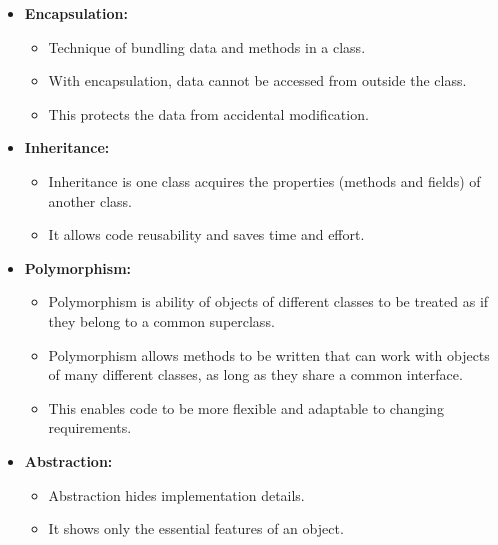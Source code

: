 

\begin{flushleft}
	
	\begin{itemize}
		\item \textbf{Encapsulation:}
		\begin{itemize}
			\item Technique of bundling data and methods in a class. 
			\item With encapsulation, data cannot be accessed from outside the class. 
			\item This protects the data from accidental modification.
			
		\end{itemize}
		
		\item \textbf{Inheritance:}
		\begin{itemize}
			\item Inheritance is one class acquires the properties (methods and fields) of another class.
			\item It allows code reusability and saves time and effort.
		\end{itemize}
	
		\newpage
		\item \textbf{Polymorphism: }
		\begin{itemize}
			\item Polymorphism is ability of objects of different classes to be treated as if they belong to a common superclass. 
			\item Polymorphism allows methods to be written that can work with objects of many different classes, as long as they share a common interface. 
			\item This enables code to be more flexible and adaptable to changing requirements.
			
		\end{itemize}
	
		\item \textbf{Abstraction:}
		\begin{itemize}
			\item Abstraction hides implementation details.
			\item It shows only the essential features of an object. 
		\end{itemize}
		
	
	\end{itemize}
		
	
\end{flushleft}
\newpage




